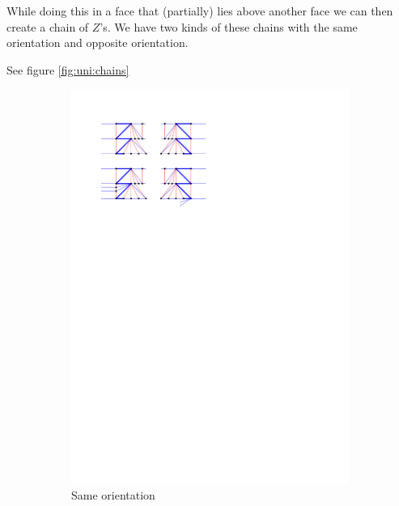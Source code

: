 While doing this in a face that (partially) lies above another face we can then create a chain of $Z$'s. We have two kinds of these chains with the same orientation and opposite orientation.

See figure \ref{fig:uni:chains}

\begin{figure}
    \centering
    \begin{subfigure}[b]{0.45 \textwidth}
        \includegraphics[width = \textwidth]{unifiedAlgo/img/post/sameChain}
        \caption{Same orientation}
    \end{subfigure}
    ~
    \begin{subfigure}[b]{0.45 \textwidth}

\end{subfigure}
\end{figure}

